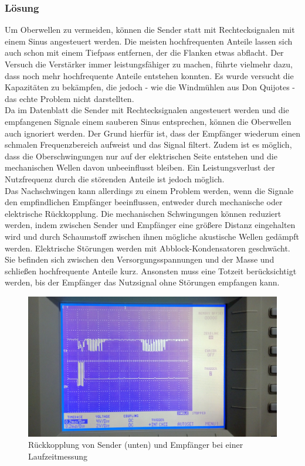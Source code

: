 \subsubsection{Lösung}
Um Oberwellen zu vermeiden, können die Sender statt mit Rechtecksignalen mit einem Sinus angesteuert werden. Die meisten hochfrequenten Anteile lassen sich auch schon mit einem Tiefpass entfernen, der die Flanken etwas abflacht. Der Versuch die Verstärker immer leistungsfähiger zu machen, führte vielmehr dazu, dass noch mehr hochfrequente Anteile entstehen konnten. Es wurde versucht die Kapazitäten zu bekämpfen, die jedoch - wie die Windmühlen aus Don Quijotes - das echte Problem nicht darstellten.\\ %
Da im Datenblatt die Sender mit Rechtecksignalen angesteuert werden und die empfangenen Signale einem sauberen Sinus entsprechen, können die Oberwellen auch ignoriert werden. Der Grund hierfür ist, dass der Empfänger wiederum einen schmalen Frequenzbereich aufweist und das Signal filtert. Zudem ist es möglich, dass die Oberschwingungen nur auf der elektrischen Seite entstehen und die mechanischen Wellen davon unbeeinflusst bleiben. Ein Leistungsverlust der Nutzfrequenz durch die störenden Anteile ist jedoch möglich.\\
Das Nachschwingen kann allerdings zu einem Problem werden, wenn die Signale den empfindlichen Empfänger beeinflussen, entweder durch mechanische oder elektrische Rückkopplung. Die mechanischen Schwingungen können reduziert werden, indem zwischen Sender und Empfänger eine größere Distanz eingehalten wird und durch Schaumstoff zwischen ihnen mögliche akustische Wellen gedämpft werden. Elektrische Störungen werden mit Abblock-Kondensatoren geschwächt. Sie befinden sich zwischen den Versorgungsspannungen und der Masse und schließen hochfrequente Anteile kurz. Ansonsten muss eine Totzeit berücksichtigt werden, bis der Empfänger das Nutzsignal ohne Störungen empfangen kann.
\begin{figure}[H]
\centering
\includegraphics[width=(\textwidth)]{oszi/15-04-16/1.jpg}
\caption{Rückkopplung von Sender (unten) und Empfänger bei einer Laufzeitmessung} \label{img:I7}
\end{figure}



